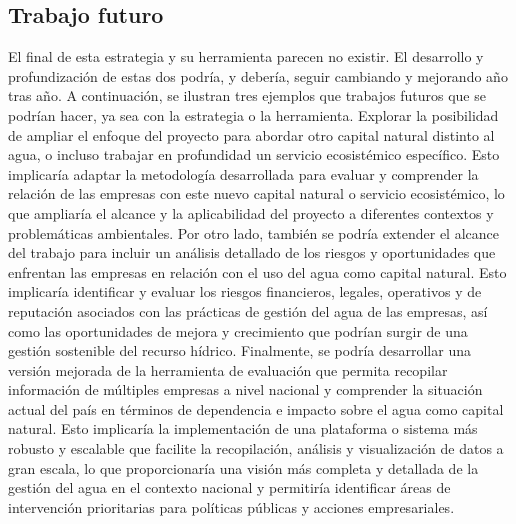 \subsection{Trabajo futuro}
El final de esta estrategia y su herramienta parecen no existir. El desarrollo y profundización de estas dos podría, y debería, seguir cambiando y mejorando año tras año. A continuación, se ilustran tres ejemplos que trabajos futuros que se podrían hacer, ya sea con la estrategia o la herramienta. Explorar la posibilidad de ampliar el enfoque del proyecto para abordar otro capital natural distinto al agua, o incluso trabajar en profundidad un servicio ecosistémico específico. Esto implicaría adaptar la metodología desarrollada para evaluar y comprender la relación de las empresas con este nuevo capital natural o servicio ecosistémico, lo que ampliaría el alcance y la aplicabilidad del proyecto a diferentes contextos y problemáticas ambientales. Por otro lado, también se podría extender el alcance del trabajo para incluir un análisis detallado de los riesgos y oportunidades que enfrentan las empresas en relación con el uso del agua como capital natural. Esto implicaría identificar y evaluar los riesgos financieros, legales, operativos y de reputación asociados con las prácticas de gestión del agua de las empresas, así como las oportunidades de mejora y crecimiento que podrían surgir de una gestión sostenible del recurso hídrico. Finalmente, se podría desarrollar una versión mejorada de la herramienta de evaluación que permita recopilar información de múltiples empresas a nivel nacional y comprender la situación actual del país en términos de dependencia e impacto sobre el agua como capital natural. Esto implicaría la implementación de una plataforma o sistema más robusto y escalable que facilite la recopilación, análisis y visualización de datos a gran escala, lo que proporcionaría una visión más completa y detallada de la gestión del agua en el contexto nacional y permitiría identificar áreas de intervención prioritarias para políticas públicas y acciones empresariales.
